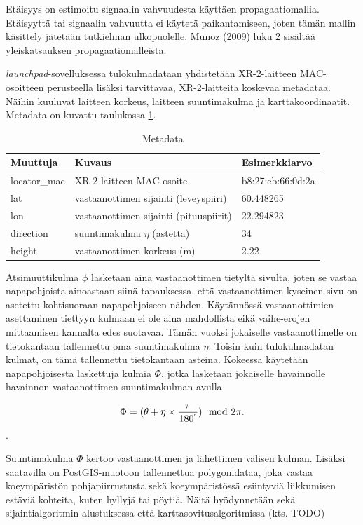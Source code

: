 \documentclass[
  12pt,
  a4paper, twoside]{book}
\begin{document}
Etäisyys on estimoitu signaalin vahvuudesta käyttäen propagaatiomallia. Etäisyyttä tai signaalin vahvuutta ei käytetä paikantamiseen, joten tämän mallin käsittely jätetään tutkielman ulkopuolelle. Munoz (2009) luku 2 sisältää yleiskatsauksen propagaatiomalleista. \citep{Munoz-2009}

\emph{launchpad}-sovelluksessa tulokulmadataan yhdistetään XR-2-laitteen MAC-osoitteen perusteella lisäksi tarvittavaa, XR-2-laitteita koskevaa metadataa. Näihin kuuluvat laitteen korkeus, laitteen suuntimakulma ja karttakoordinaatit. Metadata on kuvattu taulukossa \ref{tab:metadata}.

\def\arraystretch{1.25} 
\begin{table}[H]
\centering
\begin{tabular}{|l|l|l|}
\hline
Muuttuja & Kuvaus & Esimerkkiarvo\\
\hline
locator\_mac & XR-2-laitteen MAC-osoite & b8:27:eb:66:0d:2a\\
lat & vastaanottimen sijainti (leveyspiiri) & 60.448265\\
lon & vastaanottimen sijainti (pituuspiirit) & 22.294823\\
direction & suuntimakulma $\eta$ (astetta) & 34\\
height & vastaanottimen korkeus (m) & 2.22 \\
\hline
\end{tabular}
\caption{Metadata}
\label{tab:metadata}
\end{table}

Atsimuuttikulma \(\phi\) lasketaan aina vastaanottimen tietyltä sivulta, joten se vastaa napapohjoista ainoastaan siinä tapauksessa, että vastaanottimen kyseinen sivu on asetettu kohtisuoraan napapohjoiseen nähden. Käytännössä vastaanottimien asettaminen tiettyyn kulmaan ei ole aina mahdollista eikä vaihe-erojen mittaamisen kannalta edes suotavaa. Tämän vuoksi jokaiselle vastaanottimelle on tietokantaan tallennettu oma suuntimakulma \(\eta\). Toisin kuin tulokulmadatan kulmat, on tämä tallennettu tietokantaan asteina. Kokeessa käytetään napapohjoisesta laskettuja kulmia \(\Phi\), jotka lasketaan jokaiselle havainnolle havainnon vastaanottimen suuntimakulman avulla

\begin{align}
\Phi=(\theta + \eta \times \frac{\pi}{180^\degree}) \mod 2 \pi.
\end{align}.

Suuntimakulma \(\Phi\) kertoo vastaanottimen ja lähettimen välisen kulman. Lisäksi saatavilla on PostGIS-muotoon tallennettua polygonidataa, joka vastaa koeympäristön pohjapiirrustusta sekä koeympäristössä esiintyviä liikkumisen estäviä kohteita, kuten hyllyjä tai pöytiä. Näitä hyödynnetään sekä sijaintialgoritmin alustuksessa että karttasovitusalgoritmissa (kts. TODO)
\end{document}
